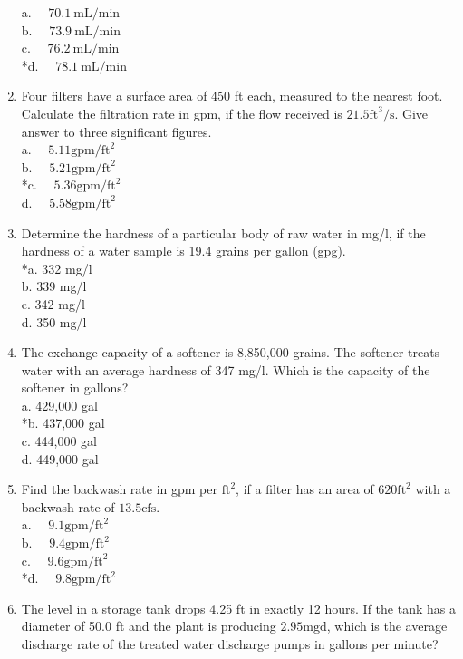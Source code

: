 \begin{enumerate}
a. $\quad 70.1 \mathrm{~mL} / \mathrm{min}$\\
b. $\quad 73.9 \mathrm{~mL} / \mathrm{min}$\\
c. $\quad 76.2 \mathrm{~mL} / \mathrm{min}$\\
*d. $\quad 78.1 \mathrm{~mL} / \mathrm{min}$\\
  \item Four filters have a surface area of 450 ft each, measured to the nearest foot. Calculate the filtration rate in gpm, if the flow received is $21.5 \mathrm{ft}^{3} / \mathrm{s}$. Give answer to three significant figures.\\
a. $\quad 5.11 \mathrm{gpm} / \mathrm{ft}^{2}$\\
b. $\quad 5.21 \mathrm{gpm} / \mathrm{ft}^{2}$\\
*c. $\quad 5.36 \mathrm{gpm} / \mathrm{ft}^{2}$\\
d. $\quad 5.58 \mathrm{gpm} / \mathrm{ft}^{2}$\\
  \item Determine the hardness of a particular body of raw water in mg/l, if the hardness of a water sample is 19.4 grains per gallon (gpg).\\
*a. 332 mg/l\\
b. 339 mg/l\\
c. 342 mg/l\\
d. 350 mg/l\\
  \item The exchange capacity of a softener is 8,850,000 grains. The softener treats water with an average hardness of 347 mg/l. Which is the capacity of the softener in gallons?\\
a. 429,000 gal\\
*b. 437,000 gal\\
c. 444,000 gal\\
d. 449,000 gal\\
  \item Find the backwash rate in gpm per $\mathrm{ft}^{2}$, if a filter has an area of $620 \mathrm{ft}^{2}$ with a backwash rate of $13.5 \mathrm{cfs}$.\\
a. $\quad 9.1 \mathrm{gpm} / \mathrm{ft}^{2}$\\
b. $\quad 9.4 \mathrm{gpm} / \mathrm{ft}^{2}$\\
c. $\quad 9.6 \mathrm{gpm} / \mathrm{ft}^{2}$\\
*d. $\quad 9.8 \mathrm{gpm} / \mathrm{ft}^{2}$ 
  \item The level in a storage tank drops 4.25 ft in exactly 12 hours. If the tank has a diameter of 50.0 ft and the plant is producing $2.95 \mathrm{mgd}$, which is the average discharge rate of the treated water discharge pumps in gallons per minute?\\

\end{enumerate}
